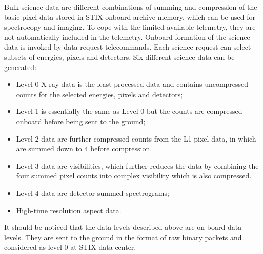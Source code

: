 \documentclass{aa}
\begin{document}
Bulk science data are different combinations of summing and compression of the basic pixel data stored in STIX onboard archive memory, which can be used for spectrocopy and imaging.
To cope with the limited available telemetry, they are not automatically included in the telemetry.
Onboard formation of the science data is invoked by data request telecommands.
Each science request can select subsets of energies, pixels and detectors.
Six different science data can be generated:
\begin{itemize}
 \item Level-0 X-ray data is the least processed data and contains uncompressed counts for the selected energies, pixels and detectors;
\item Level-1 is essentially the same as Level-0 but the counts are compressed onboard before being sent to the ground;
\item Level-2 data are further compressed counts from the L1 pixel data, in which are summed down to 4 before compression.
\item Level-3 data are visibilities, which further reduces the data by combining the four summed pixel counts into complex visibility which is also compressed.
\item Level-4 data are detector summed spectrograms;
\item High-time resolution aspect data.
\end{itemize}
It should be noticed that the data levels described 
above are on-board data levels. They are sent to the ground in the format of raw binary packets and 
considered as level-0 at STIX data center.  
\begin{table}[h]
\centering
\caption{STIX raw telemetry data coverage, data rate and typical reception delay at SDC.  }
\label{tb:raw_types}
\end{table}
\end{document}
